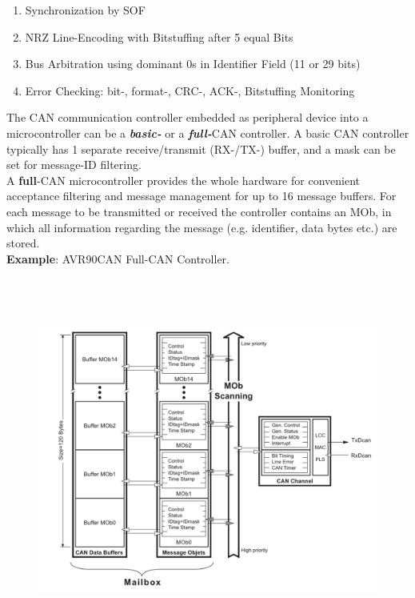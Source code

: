 \begin{enumerate}
\item  Synchronization by SOF
\item  NRZ Line-Encoding with Bitstuffing after 5 equal Bits
\item  Bus Arbitration using dominant 0s in Identifier Field (11 or 29 bits)
\item  Error Checking: bit-, format-, CRC-, ACK-, Bitstuffing Monitoring
\end{enumerate}

The CAN communication controller embedded as peripheral device into a microcontroller can be a \textbf{\textit{basic-}} or a \textbf{\textit{full-}}CAN controller. A basic CAN controller typically has 1 separate receive/transmit (RX-/TX-) buffer, and a mask can be set for message-ID filtering.\\

A \textbf{full}-CAN microcontroller provides the whole hardware for convenient acceptance filtering and message management for up to 16 message buffers. For each message to be transmitted or received the controller contains an MOb, in which all information regarding the message (e.g. identifier, data bytes etc.) are stored.\\

\textbf{Example}: AVR90CAN Full-CAN Controller. 

    \begin{figure}[h]
    \centering
    \includegraphics[width=15cm, height=12cm]{Images/image55.png}
    \label{fig:Fig }
    \end{figure}

